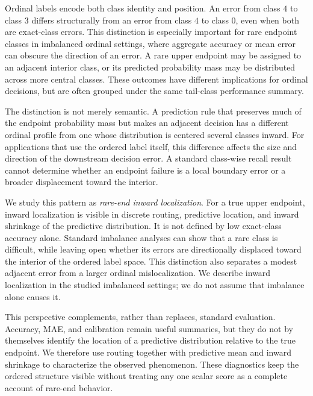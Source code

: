 Ordinal labels encode both class identity and position. An error from class
$4$ to class $3$ differs structurally from an error from class $4$ to class
$0$, even when both are exact-class errors. This distinction is especially
important for rare endpoint classes in imbalanced ordinal settings, where
aggregate accuracy or mean error can obscure the direction of an error. A rare
upper endpoint may be assigned to an adjacent interior class, or its predicted
probability mass may be distributed across more central classes. These outcomes
have different implications for ordinal decisions, but are often grouped under
the same tail-class performance summary.

The distinction is not merely semantic. A prediction rule that preserves much
of the endpoint probability mass but makes an adjacent decision has a different
ordinal profile from one whose distribution is centered several classes inward.
For applications that use the ordered label itself, this difference affects the
size and direction of the downstream decision error. A standard class-wise
recall result cannot determine whether an endpoint failure is a local boundary
error or a broader displacement toward the interior.

We study this pattern as \emph{rare-end inward localization}. For a true upper
endpoint, inward localization is visible in discrete routing, predictive
location, and inward shrinkage of the predictive distribution. It is not
defined by low exact-class accuracy alone. Standard imbalance analyses can show
that a rare class is difficult, while leaving open whether its errors are
directionally displaced toward the interior of the ordered label space. This
distinction also separates a modest adjacent error from a larger ordinal
mislocalization. We describe inward localization in the studied imbalanced
settings; we do not assume that imbalance alone causes it.

This perspective complements, rather than replaces, standard evaluation.
Accuracy, MAE, and calibration remain useful summaries, but they do not by
themselves identify the location of a predictive distribution relative to the
true endpoint. We therefore use routing together with predictive mean and
inward shrinkage to characterize the observed phenomenon. These diagnostics
keep the ordered structure visible without treating any one scalar score as a
complete account of rare-end behavior.

